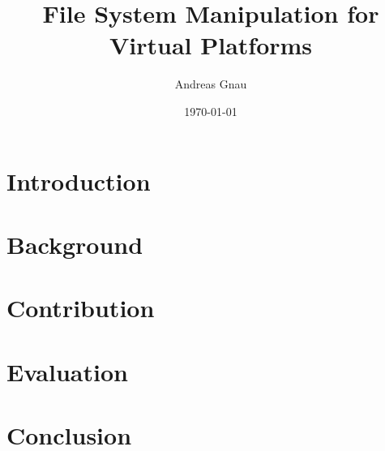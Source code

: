 \documentclass{beamer}
\title[File System Manipulation for Virtual Platforms]{File System Manipulation for Virtual Platforms}
\subtitle{}
\author{Andreas Gnau}
\date{\today}
\begin{document}
    

    \section[Outline]{}
    \section{Introduction}
        
        
        
    \section{Background}
        
        
        

    \section{Contribution}
        
    \section{Evaluation}
        
        
    \section{Conclusion}
        
        
        
        
    
%	
\end{document}
